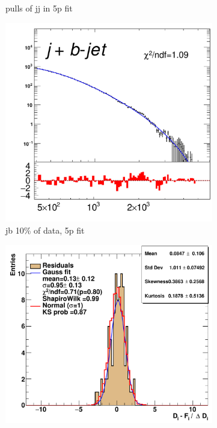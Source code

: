 \begin{figure}[H]
\begin{subfigure}[h]{0.4\linewidth}
    \caption{pulls of jj in 5p fit}
    \end{subfigure}
    \hfill
    \begin{subfigure}[h]{0.38\linewidth}
    \includegraphics[scale=0.3]{figs//app/10data/pub_mass_10per_extrapolate_jb.pdf}%
     \caption{jb 10\% of data, 5p fit}
     \end{subfigure}
     \hfill
    \begin{subfigure}[h]{0.4\linewidth}
    \includegraphics[scale=0.32]{figs/app/10data/pub_mass_10per_extrapolate_residuals_jb.pdf}%

\end{subfigure}
\end{figure}
